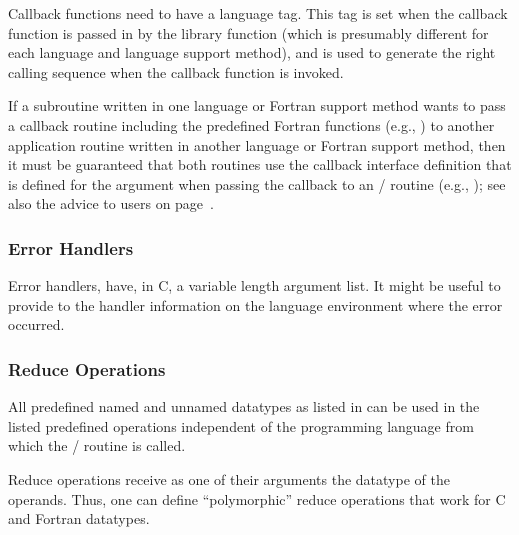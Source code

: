 \begin{implementors}
Callback functions need to have a language tag.  This tag is set
when the callback function is passed in by the library function (which
is presumably different for each language and language support method),
and is used to generate
the right calling sequence when the callback function is invoked.
\end{implementors}

\begin{users}
\label{advice:bindings:predefined:Fortran:users}%
If a subroutine written in one language or Fortran support method wants to
pass a callback routine including the predefined Fortran functions (e.g.,
) to another application routine written in another language
or Fortran support method, then it must be guaranteed that both routines use the callback
interface definition that is defined for the argument when passing the callback to an \MPI/
routine (e.g., );
see also the advice to users on page~\pageref{advice:context:predefined:Fortran:users}.
\end{users}

\subsubsection{Error Handlers}

\begin{implementors}
Error handlers, have,
in C, a variable length argument list.
It might be useful to
provide to the handler information on the language environment where
the error occurred.
\end{implementors}

\subsubsection{Reduce Operations}

All predefined named and unnamed datatypes as
listed in  can be used in the listed
predefined operations independent of the programming language from
which the \MPI/ routine is called.

\begin{users}
Reduce operations receive as one of their arguments the datatype of the
operands.
Thus, one can define ``polymorphic'' reduce
operations that work for C and Fortran datatypes.
\end{users}

